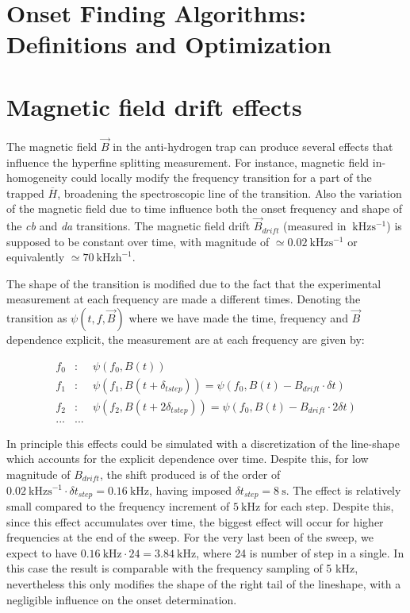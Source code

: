 \documentclass[11pt,a4paper,oneside]{article}
\begin{document}
\section{Onset Finding Algorithms: Definitions and Optimization}

\section{Magnetic field drift effects}

The magnetic field $\vec{B}$ in the anti-hydrogen trap can produce several effects that influence the hyperfine splitting measurement. For instance, magnetic field in-homogeneity could locally modify the frequency transition for a part of the trapped $\overline{H}$, broadening the spectroscopic line of the transition. Also
the variation of the magnetic field due to time influence both the onset frequency and shape of the \textit{cb} and \textit{da} transitions. The magnetic field drift $\vec{B}_{drift}$ (measured in $\SI{}{\kilo \hertz \second\tothe{-1}}$) is supposed to be constant over time, with magnitude of $ \simeq \SI{0.02}{\kilo \hertz \second\tothe{-1}}$ or equivalently $ \simeq \SI{70}{\kilo \hertz \hour\tothe{-1}}$.

The shape of the transition  is modified due to the fact that the experimental measurement at each frequency are made a different times. Denoting the transition as $\psi(t,f,\vec{B})$ where we have made the time, frequency and $\vec{B}$ dependence explicit, the measurement are at each frequency are given by:

\begin{eqnarray*}
f_{0}& : &\psi(f_{0},B(t))   \\
f_{1}& : &\psi(f_{1},B(t + \delta_{tstep})) = \psi(f_{0},B(t) - B_{drift} \cdot \delta t) \\
f_{2}& : &\psi(f_{2},B(t + 2\delta_{tstep})) = \psi(f_{0},B(t) - B_{drift} \cdot 2 \delta t)\\
... & ...
\end{eqnarray*}

In principle this effects could be simulated with a discretization of the line-shape which accounts for the explicit dependence over time. Despite this, for low magnitude of $B_{drift}$, the shift produced is of the order of $\SI{0.02}{\kilo \hertz \second \tothe{-1}} \cdot \delta t_{step} = \SI{0.16}{\kilo \hertz}$, having imposed $\delta t_{step} =\SI{8}{\second}$. The effect is relatively small compared to the frequency increment of $\SI{5}{\kilo \hertz}$ for each step. Despite this, since this effect accumulates over time, the biggest effect will occur for higher frequencies at the end of the sweep. For the very last been of the sweep, we expect to have $ \SI{0.16}{\kilo \hertz} \cdot 24  = \SI{3.84}{\kilo \hertz} $, where 24 is number of step in a single. In this case the result is comparable with the frequency sampling of 5 kHz, nevertheless this only modifies the shape of the right tail of the lineshape, with a negligible influence on the onset determination.
\end{document}
